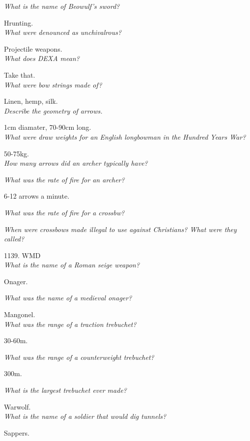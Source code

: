 \documentclass[12pt]{article}
\begin{document}
\textit{What is the name of Beowulf's sword?}

Hrunting.\\

\textit{What were denounced as unchivalrous?}

Projectile weapons.\\

\textit{What does DEXA mean?}

Take that.\\

\textit{What were bow strings made of?}

Linen, hemp, silk.\\

\textit{Describe the geometry of arrows.}

1cm diamater, 70-90cm long.\\

\textit{What were draw weights for an English longbowman in the Hundred Years War?}

50-75kg.\\

\textit{How many arrows did an archer typically have?}

\textit{What was the rate of fire for an archer?}

6-12 arrows a minute.

\textit{What was the rate of fire for a crossbw?}

\textit{When were crossbows made illegal to use against Christians? What were they called?}

1139. WMD\\

\textit{What is the name of a Roman seige weapon?}

Onager.

\textit{What was the name of a medieval onager?}

Mangonel.\\

\textit{What was the range of a traction trebuchet?}

30-60m.

\textit{What was the range of a counterweight trebuchet?}

300m.

\textit{What is the largest trebuchet ever made?}

Warwolf.\\

\textit{What is the name of a soldier that would dig tunnels?}

Sappers.\\
\end{document}
